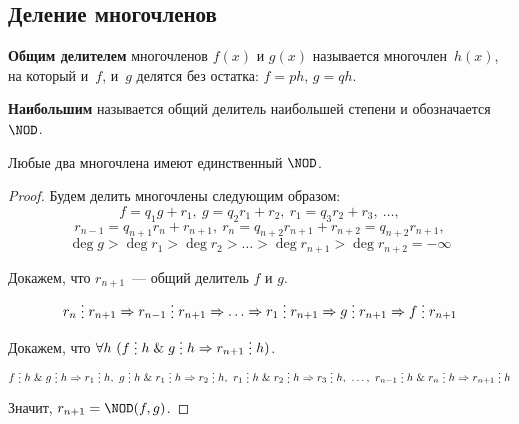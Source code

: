 \subsection{Деление многочленов}
\textbf{Общим делителем} многочленов $f(x)$ и $g(x)$ называется многочлен~$h(x)$, на который и~$f$, и~$g$ делятся без остатка: $f = ph$, $g = qh$.

\textbf{Наибольшим} называется общий делитель наибольшей степени и обозначается $\NOD$.

\begin{theorem}
Любые два многочлена имеют единственный $\NOD$.
\end{theorem}
\begin{proof}
Будем делить многочлены следующим образом:
\begin{equation*}
f = q_1 g + r_1, \
g = q_2 r_1 + r_2, \
r_1 = q_3 r_2 + r_3, \ \ldots,
\end{equation*}
\begin{equation*}
r_{n-1} = q_{n+1} r_n + r_{n+1}, \
r_n = q_{n+2} r_{n+1} + r_{n+2} = q_{n+2} r_{n+1},
\end{equation*}
\begin{equation*}
\deg g > \deg r_1 > \deg r_2 > \ldots > \deg r_{n+1} > \deg r_{n+2} = -\infty
\end{equation*}

Докажем, что $r_{n+1}$~--- общий делитель $f$ и $g$.
\begin{equation*}
r_n \mult r_{n+1} \Rightarrow
r_{n-1} \mult r_{n+1} \Rightarrow
\ldots \Rightarrow
r_1 \mult r_{n+1} \Rightarrow
g \mult r_{n+1} \Rightarrow
f \mult r_{n+1}
\end{equation*}

Докажем, что $\forall h \ (f \mult h \lAnd g \mult h \Rightarrow r_{n+1} \mult h)$.
\begin{equation*}
f \mult h \lAnd g \mult h \Rightarrow r_1 \mult h, \
g \mult h \lAnd r_1 \mult h \Rightarrow r_2 \mult h, \
r_1 \mult h \lAnd r_2 \mult h \Rightarrow r_3 \mult h, \ \ldots, \
r_{n-1} \mult h \lAnd r_n \mult h \Rightarrow r_{n+1} \mult h
\end{equation*}

Значит, $r_{n+1} = \NOD(f, g)$.
\end{proof}